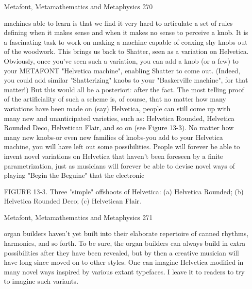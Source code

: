 Metafont, Metamathematics and Metaphysics                                          270

machines able to learn is that we find it very hard to articulate a set of rules defining
when it makes sense and when it makes no sense to perceive a knob. It is a fascinating
task to work on making a machine capable of coaxing shy knobs out of the woodwork.
This brings us back to Shatter, seen as a variation on Helvetica. Obviously, once you've
seen such a variation, you can add a knob (or a few) to your METAFONT "Helvetica
machine", enabling Shatter to come out. (Indeed, you could add similar "Shatterizing"
knobs to your "Baskerville machine", for that matter!) But this would all be a posteriori:
after the fact. The most telling proof of the artificiality of such a scheme is, of course, that
no matter how many variations have been made on (say) Helvetica, people can still come
up with many new and unanticipated varieties, such as: Helvetica Rounded, Helvetica
Rounded Deco, Helvetican Flair, and so on (see Figure 13-3).
No matter how many new knobs-or even new families of knobs-you add to your
Helvetica machine, you will have left out some possibilities. People will forever be able
to invent novel variations on Helvetica that haven't been foreseen by a finite
parametrization, just as musicians will forever be able to devise novel ways of playing
"Begin the Beguine" that the electronic

FIGURE 13-3. Three "simple" offshoots of Helvetica: (a) Helvetica Rounded; (b)
Helvetica Rounded Deco; (c) Helvetican Flair.




Metafont, Metamathematics and Metaphysics                                                  271

organ builders haven't yet built into their elaborate repertoire of canned rhythms,
harmonies, and so forth. To be sure, the organ builders can always build in extra
possibilities after they have been revealed, but by then a creative musician will have long
since moved on to other styles. One can imagine Helvetica modified in many novel ways
inspired by various extant typefaces. I leave it to readers to try to imagine such variants.

